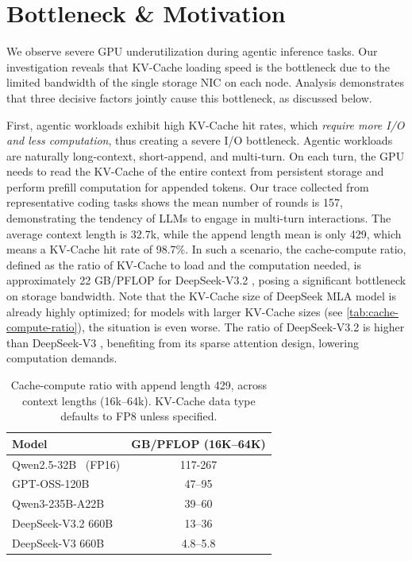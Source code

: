 \section{Bottleneck \& Motivation}
\label{sec:motivations}

We observe severe GPU underutilization during agentic inference tasks.
Our investigation reveals that KV-Cache loading speed is the bottleneck due to the limited bandwidth of the single storage NIC on each node.
Analysis demonstrates that three decisive factors jointly cause this bottleneck, as discussed below.


First, agentic workloads exhibit high KV-Cache hit rates, which \emph{require more I/O and less computation}, thus creating a severe I/O bottleneck.
Agentic workloads are naturally long-context, short-append, and multi-turn.
On each turn, the GPU needs to read the KV-Cache of the entire context from persistent storage and perform prefill computation for appended tokens.
Our trace collected from representative coding tasks shows the mean number of rounds is 157, demonstrating the tendency of LLMs to engage in multi-turn interactions. The average context length is 32.7k, while the append length mean is only 429, which means a KV-Cache hit rate of 98.7\%. 
In such a scenario, the cache-compute ratio, defined as the ratio of KV-Cache to load and the computation needed, is approximately 22 GB/PFLOP for DeepSeek-V3.2 \cite{DeepSeekV32}, posing a significant bottleneck on storage bandwidth. 
Note that the KV-Cache size of DeepSeek MLA model is already highly optimized; for models with larger KV-Cache sizes (see \autoref{tab:cache-compute-ratio}), the situation is even worse. 
The ratio of DeepSeek-V3.2 is higher than DeepSeek-V3 \cite{deepseekv3}, benefiting from its sparse attention design, lowering computation demands.

\begin{table}[t]
  \centering
  \caption{\normalfont Cache-compute ratio with append length 429, across context lengths (16k--64k). KV-Cache data type defaults to FP8 unless specified.}
  \begin{tabular}{lc}
  \toprule
  Model & GB/PFLOP (16K--64K) \\
  \midrule
  Qwen2.5-32B~\cite{qwen2025qwen25technicalreport} (FP16) & 117-267 \\
  GPT-OSS-120B~\cite{GPT-OSS} & 47--95 \\
  Qwen3-235B-A22B~\cite{yang2025qwen3technicalreport} & 39--60 \\
  DeepSeek-V3.2 660B~\cite{DeepSeekV32} & 13--36 \\
  DeepSeek-V3 660B~\cite{deepseekv3} & 4.8--5.8 \\
  \bottomrule
  \end{tabular}
  \label{tab:cache-compute-ratio}
\end{table}

